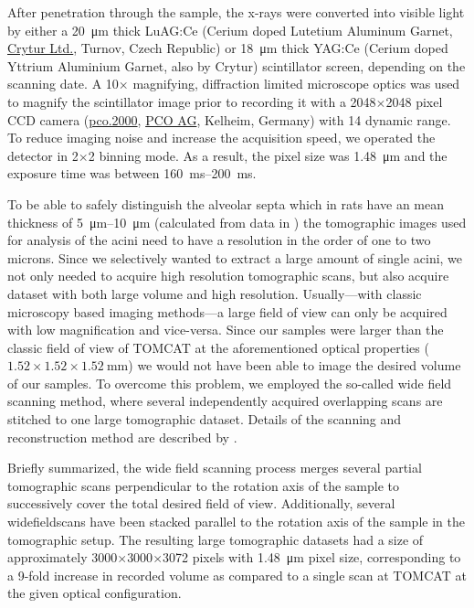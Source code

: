 \documentclass[twoside,paper=a4,abstract=true,english,DIVcalc]{scrartcl}
\begin{document}
After penetration through the sample, the x-rays were converted into visible light by either a \SI{20}{\micro\meter} thick LuAG:Ce (Cerium doped Lutetium Aluminum Garnet, \href{http://www.crytur.cz/}{Crytur Ltd.}, Turnov, Czech Republic) or \SI{18}{\micro\meter} thick YAG:Ce (Cerium doped Yttrium Aluminium Garnet, also by Crytur) scintillator screen, depending on the scanning date. A 10\(\times\) magnifying, diffraction limited microscope optics was used to magnify the scintillator image prior to recording it with a 2048\(\times\)2048 pixel CCD camera (\href{http://www.pco.de/sensitive-cameras/pco2000/}{pco.2000}, \href{http://www.pco.de/}{PCO AG}, Kelheim, Germany) with \SI{14}{\bit} dynamic range. To reduce imaging noise and increase the acquisition speed, we operated the detector in 2\(\times\)2 binning mode. As a result, the pixel size was \SI{1.48}{\micro\meter} and the exposure time was between \SIrange{160}{200}{\milli\second}.

To be able to safely distinguish the alveolar septa which in rats have an mean thickness of \SIrange{5}{10}{\micro\meter} (calculated from data in \citet{Burri1974}) the tomographic images used for analysis of the acini need to have a resolution in the order of one to two microns. Since we selectively wanted to extract a large amount of single acini, we not only needed to acquire high resolution tomographic scans, but also acquire dataset with both large volume and high resolution. Usually---with classic microscopy based imaging methods---a large field of view can only be acquired with low magnification and vice-versa. Since our samples were larger than the classic field of view of TOMCAT at the aforementioned optical properties (\(1.52\times1.52\times\SI{1.52}{\milli\meter}\)) we would not have been able to image the desired volume of our samples. To overcome this problem, we employed the so-called wide field scanning method, where several independently acquired overlapping scans are stitched to one large tomographic dataset. Details of the scanning and reconstruction method are described by \citet{Haberthuer2010a}. 

Briefly summarized, the wide field scanning process merges several partial tomographic scans perpendicular to the rotation axis of the sample to successively cover the total desired field of view. Additionally, several widefieldscans have been stacked parallel to the rotation axis of the sample in the tomographic setup. The resulting large tomographic datasets had a size of approximately 3000\(\times\)3000\(\times\)3072 pixels with \SI{1.48}{\micro\meter} pixel size, corresponding to a 9-fold increase in recorded volume as compared to a single scan at TOMCAT at the given optical configuration.
\end{document}
